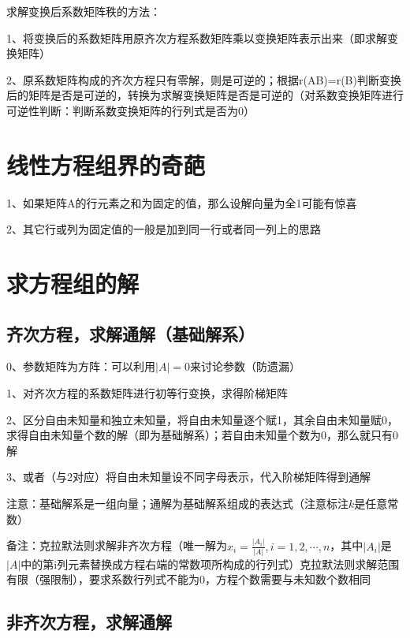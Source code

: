 求解变换后系数矩阵秩的方法：

1、将变换后的系数矩阵用原齐次方程系数矩阵乘以变换矩阵表示出来（即求解变换矩阵）

2、原系数矩阵构成的齐次方程只有零解，则是可逆的；根据r(AB)=r(B)判断变换后的矩阵是否是可逆的，转换为求解变换矩阵是否是可逆的（对系数变换矩阵进行可逆性判断：判断系数变换矩阵的行列式是否为0）

\section{线性方程组界的奇葩}

1、如果矩阵A的行元素之和为固定的值，那么设解向量为全1可能有惊喜

2、其它行或列为固定值的一般是加到同一行或者同一列上的思路

\section{求方程组的解}



\subsection{齐次方程，求解通解（基础解系）}

0、参数矩阵为方阵：可以利用$|A| = 0$来讨论参数（防遗漏）

1、对齐次方程的系数矩阵进行初等行变换，求得阶梯矩阵

2、区分自由未知量和独立未知量，将自由未知量逐个赋1，其余自由未知量赋0，求得自由未知量个数的解（即为基础解系）；若自由未知量个数为0，那么就只有0解

3、或者（与2对应）将自由未知量设不同字母表示，代入阶梯矩阵得到通解

注意：基础解系是一组向量；通解为基础解系组成的表达式（注意标注$k$是任意常数）

备注：克拉默法则求解非齐次方程（唯一解为$x_i = \frac {|A_i|}{|A|},i=1,2,\cdots, n$，其中$|A_i|$是$|A|$中的第i列元素替换成方程右端的常数项所构成的行列式）克拉默法则求解范围有限（强限制），要求系数行列式不能为0，方程个数需要与未知数个数相同



\subsection{非齐次方程，求解通解}

